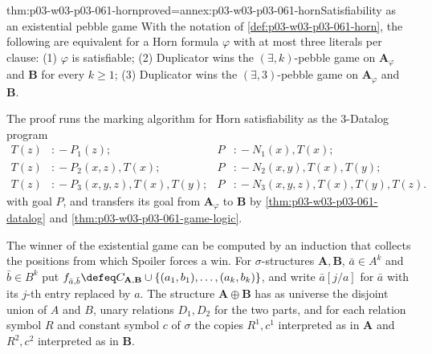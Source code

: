 \begin{hbtheorem}{thm:p03-w03-p03-061-horn}{proved=annex:p03-w03-p03-061-horn}{Satisfiability as an existential pebble game}
With the notation of \cref{def:p03-w03-p03-061-horn}, the following are
equivalent for a Horn formula \(\varphi\) with at most three literals per
clause: (1) \(\varphi\) is satisfiable; (2) Duplicator wins the
\((\exists,k)\)-pebble game on \(\mathbf A_\varphi\) and \(\mathbf B\) for
every \(k\ge1\); (3) Duplicator wins the \((\exists,3)\)-pebble game on
\(\mathbf A_\varphi\) and \(\mathbf B\).
\end{hbtheorem}

The proof runs the marking algorithm for Horn satisfiability as the
3-Datalog program
\[
\begin{aligned}
 T(z)&\mathrel{{:}\!-}P_1(z);
 &P&\mathrel{{:}\!-}N_1(x),T(x);\\
 T(z)&\mathrel{{:}\!-}P_2(x,z),T(x);
 &P&\mathrel{{:}\!-}N_2(x,y),T(x),T(y);\\
 T(z)&\mathrel{{:}\!-}P_3(x,y,z),T(x),T(y);
 &P&\mathrel{{:}\!-}N_3(x,y,z),T(x),T(y),T(z).
\end{aligned}
\]
with goal \(P\), and transfers its goal from \(\mathbf A_\varphi\) to
\(\mathbf B\) by \cref{thm:p03-w03-p03-061-datalog} and
\cref{thm:p03-w03-p03-061-game-logic}.

The winner of the existential game can be computed by an induction that
collects the positions from which Spoiler forces a win. For \(\sigma\)-structures
\(\mathbf A,\mathbf B\), \(\bar a\in A^k\) and \(\bar b\in B^k\) put
\(f_{\bar a,\bar b}\defeq C_{\mathbf A,\mathbf B}\cup\{(a_1,b_1),\ldots,
(a_k,b_k)\}\), and write \(\bar a[j/a]\) for \(\bar a\) with its \(j\)-th entry
replaced by \(a\). The structure \(\mathbf A\oplus\mathbf B\) has as universe
the disjoint union of \(A\) and \(B\), unary relations \(D_1,D_2\) for the two
parts, and for each relation symbol \(R\) and constant symbol \(c\) of
\(\sigma\) the copies \(R^1,c^1\) interpreted as in \(\mathbf A\) and
\(R^2,c^2\) interpreted as in \(\mathbf B\).

